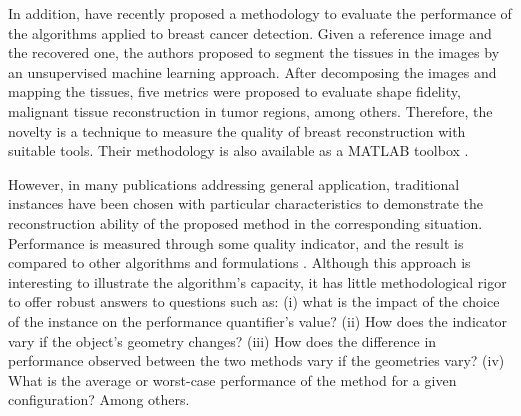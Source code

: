 		In addition, \cite{kurrant2021evaluating} have recently proposed a methodology to evaluate the performance of the algorithms applied to breast cancer detection. Given a reference image and the recovered one, the authors proposed to segment the tissues in the images by an unsupervised machine learning approach. After decomposing the images and mapping the tissues, five metrics were proposed to evaluate shape fidelity, malignant tissue reconstruction in tumor regions, among others. Therefore, the novelty is a technique to measure the quality of breast reconstruction with suitable tools. Their methodology is also available as a MATLAB toolbox \citep{kurrant2021mwsegeval}.
		
		However, in many publications addressing general application, traditional instances have been chosen with particular characteristics to demonstrate the reconstruction ability of the proposed method in the corresponding situation. Performance is measured through some quality indicator, and the result is compared to other algorithms and formulations \citep{zhong2020multiresolution,zhang2020wavelet,zhou2021improved}. Although this approach is interesting to illustrate the algorithm's capacity, it has little methodological rigor to offer robust answers to questions such as: (i) what is the impact of the choice of the instance on the performance quantifier's value? (ii) How does the indicator vary if the object's geometry changes? (iii) How does the difference in performance observed between the two methods vary if the geometries vary? (iv) What is the average or worst-case performance of the method for a given configuration? Among others.
		
